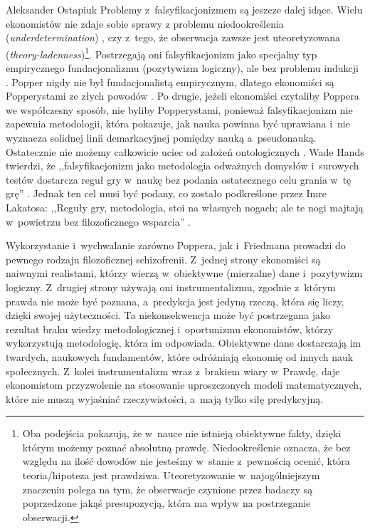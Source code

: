 \begin{artplenv}{Aleksander Ostapiuk}
Problemy z~falsyfikacjonizmem są jeszcze dalej idące. Wielu ekonomistów nie zdaje sobie sprawy z problemu niedookreślenia
(\textit{underdetermination})
\parencite{quine_two_1951},
czy z~tego, że obserwacja zawsze jest
uteoretyzowana (\textit{theory-ladenness})\footnote{Oba podejścia pokazują, że w~nauce nie istnieją obiektywne fakty,
dzięki którym możemy poznać absolutną prawdę. Niedookreślenie oznacza, że bez względu na ilość dowodów nie jesteśmy
w~stanie z~pewnością ocenić, która teoria/hipoteza jest prawdziwa. Uteoretyzowanie w~najogólniejszym znaczeniu polega na
tym, że obserwacje czynione przez badaczy są poprzedzone jakąś presupozycją, która ma wpływ na postrzeganie obserwacji.}.
Postrzegają oni falsyfikacjonizm jako specjalny typ empirycznego fundacjonalizmu (pozytywizm logiczny), ale bez
problemu indukcji
\parencite[s.~292]{hands_reflection_2001}.
Popper nigdy nie był fundacjonalistą empirycznym,
dlatego ekonomiści są Popperystami ze złych powodów
\parencite[s.~292]{hands_reflection_2001}.
Po drugie, jeżeli
ekonomiści czytaliby Poppera we współczesny sposób, nie byliby Popperystami, ponieważ falsyfikacjonizm nie zapewnia
metodologii, która pokazuje, jak nauka powinna być uprawiana i~nie wyznacza solidnej linii demarkacyjnej pomiędzy nauką
a~pseudonauką. Ostatecznie nie możemy całkowicie uciec od założeń ontologicznych
\parencite{kuhn_structure_1962,feyerabend_against_1975,mccloskey_rhetoric_1998,hands_reflection_2001}.
Wade Hands twierdzi, że ,,falsyfikacjonizm jako metodologia odważnych
domysłów i~surowych testów dostarcza reguł gry w~naukę bez podania ostatecznego celu grania w~tę grę''
\parencite[s.~293]{hands_reflection_2001}.
Jednak ten cel musi być podany, co zostało podkreślone przez Imre Lakatosa:
,,Reguły gry, metodologia, stoi na własnych nogach; ale te nogi majtają w~powietrzu bez filozoficznego wsparcia''
\parencite[s.~154]{lakatos_methodology_1980}.

Wykorzystanie i~wychwalanie zarówno Poppera, jak i~Friedmana prowadzi do pewnego rodzaju filozoficznej
schizofrenii. Z~jednej strony ekonomiści są naiwnymi realistami, którzy wierzą w~obiektywne (mierzalne)
dane i~pozytywizm logiczny. Z~drugiej strony używają oni instrumentalizmu,
zgodnie z~którym prawda nie może być poznana, a~predykcja jest jedyną rzeczą, która
się liczy, dzięki swojej użyteczności. Ta niekonsekwencja może być postrzegana jako rezultat braku wiedzy
metodologicznej i~oportunizmu ekonomistów, którzy wykorzystują metodologię, która im odpowiada. Obiektywne dane dostarczają im
twardych, naukowych fundamentów, które odróżniają ekonomię od innych nauk społecznych. Z~kolei instrumentalizm
wraz z~brakiem wiary w~Prawdę, daje ekonomistom przyzwolenie na stosowanie uproszczonych modeli matematycznych,
które nie muszą wyjaśniać
rzeczywistości, a~mają tylko siłę predykcyjną. 


\end{artplenv}
